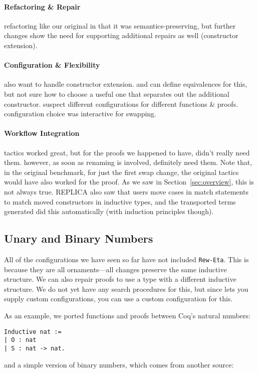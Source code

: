 \paragraph{Refactoring \& Repair}
refactoring like our original in that it was semantics-preserving, but further changes
show the need for supporting additional repairs as well (constructor extension).

\paragraph{Configuration \& Flexibility}
also want to handle constructor extension. and can define equivalences for this, but not sure how 
to choose a useful one that separates out the additional constructor. suspect different configurations
for different functions \& proofs.
configuration choice was interactive for swapping.

\paragraph{Workflow Integration}
tactics worked great, but for the proofs we happened to have, didn't really need them.
however, as soon as renaming is involved, definitely need them.
Note that, in the original benchmark, for just the first swap change,
the original tactics would have also worked for the proof. 
As we saw in Section~\ref{sec:overview}, this is not always true.
REPLICA also saw that users move cases in match statements to match moved constructors
in inductive types, and the transported terms \toolname generated did this automatically
(with induction principles though).

\subsection{Unary and Binary Numbers}
\label{sec:bin}

All of the configurations we have seen so far have not included \lstinline{Rew-Eta}.
This is because they are all ornaments---all changes preserve the same inductive structure.
We can also repair proofs to use a type with a different inductive structure.
We do not yet have any search procedures for this, but since \toolname lets you supply
custom configurations, you can use a custom configuration for this.

As an example, we ported functions and proofs between Coq's natural numbers:

\begin{lstlisting}
Inductive nat :=
| O : nat
| S : nat -> nat.
\end{lstlisting}
and a simple version of binary numbers, which comes from another source:

